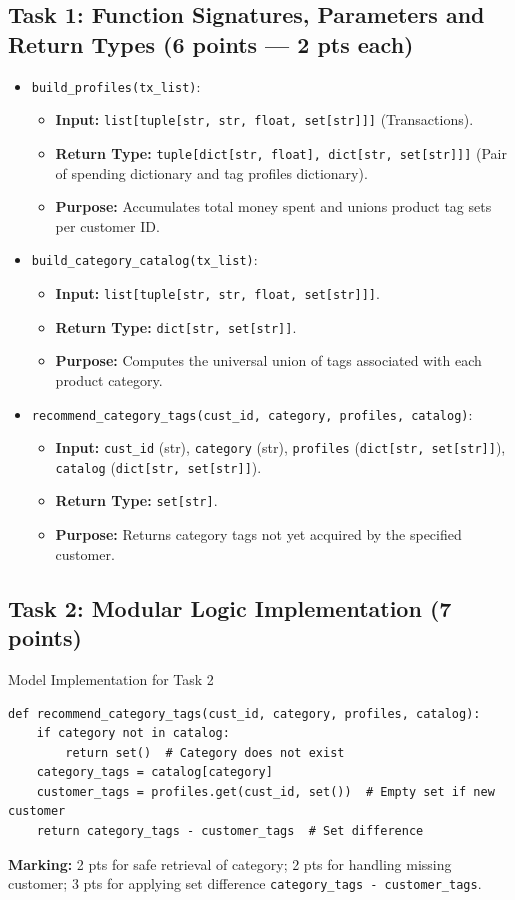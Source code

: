 \documentclass[11pt,a4paper]{article}
\begin{document}
\subsection*{Task 1: Function Signatures, Parameters and Return Types (6 points --- 2 pts each)}
\begin{itemize}
\item \texttt{build\_profiles(tx\_list)}:
  \begin{itemize}
  \item \textbf{Input:} \texttt{list[tuple[str, str, float, set[str]]]} (Transactions).
  \item \textbf{Return Type:} \texttt{tuple[dict[str, float], dict[str, set[str]]]} (Pair of spending dictionary and tag profiles dictionary).
  \item \textbf{Purpose:} Accumulates total money spent and unions product tag sets per customer ID.
  \end{itemize}
\item \texttt{build\_category\_catalog(tx\_list)}:
  \begin{itemize}
  \item \textbf{Input:} \texttt{list[tuple[str, str, float, set[str]]]}.
  \item \textbf{Return Type:} \texttt{dict[str, set[str]]}.
  \item \textbf{Purpose:} Computes the universal union of tags associated with each product category.
  \end{itemize}
\item \texttt{recommend\_category\_tags(cust\_id, category, profiles, catalog)}:
  \begin{itemize}
  \item \textbf{Input:} \texttt{cust\_id} (str), \texttt{category} (str), \texttt{profiles} (\texttt{dict[str, set[str]]}), \texttt{catalog} (\texttt{dict[str, set[str]]}).
  \item \textbf{Return Type:} \texttt{set[str]}.
  \item \textbf{Purpose:} Returns category tags not yet acquired by the specified customer.
  \end{itemize}
\end{itemize}

\subsection*{Task 2: Modular Logic Implementation (7 points)}
\begin{solbox}{Model Implementation for Task 2}
\begin{lstlisting}
def recommend_category_tags(cust_id, category, profiles, catalog):
    if category not in catalog:
        return set()  # Category does not exist
    category_tags = catalog[category]
    customer_tags = profiles.get(cust_id, set())  # Empty set if new customer
    return category_tags - customer_tags  # Set difference
\end{lstlisting}
\end{solbox}
\textbf{Marking:} 2 pts for safe retrieval of category; 2 pts for handling missing customer; 3 pts for applying set difference \texttt{category\_tags - customer\_tags}.
\end{document}
